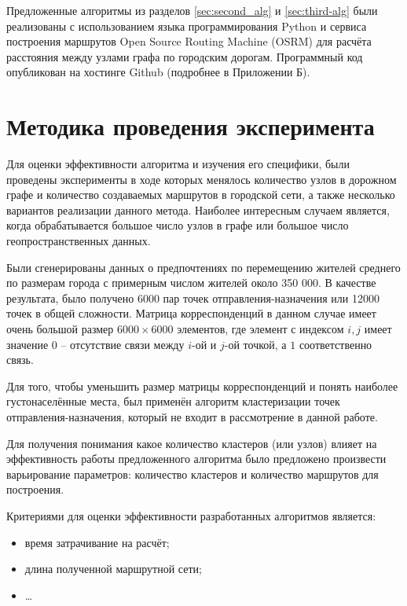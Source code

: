 Предложенные алгоритмы из разделов \ref{sec:second_alg} и \ref{sec:third-alg} были реализованы с использованием языка 
программирования Python и сервиса построения маршрутов Open Source Routing Machine (OSRM) для расчёта расстояния между 
узлами графа по городским дорогам. Программный код опубликован на хостинге Github (подробнее в Приложении Б).

\section{Методика проведения эксперимента}
Для оценки эффективности алгоритма и изучения его специфики, были проведены эксперименты в ходе которых 
менялось количество узлов в дорожном графе и количество создаваемых маршрутов в городской сети, а также 
несколько вариантов реализации данного метода. Наиболее интересным случаем является, когда обрабатывается 
большое число узлов в графе или большое число геопространственных данных.

Были сгенерированы данных о предпочтениях по перемещению жителей среднего по размерам города с примерным 
числом жителей около 350 000. В качестве результата, было получено 6000 пар точек отправления-назначения или 
12000 точек в общей сложности. Матрица корреспонденций в данном случае имеет очень большой размер 
\( 6000 \times 6000 \) элементов, где элемент с индексом \( i, j \) имеет значение \( 0 \) -- отсутствие связи 
между \( i \)-ой и \( j \)-ой точкой, а \( 1 \) соответственно связь.

Для того, чтобы уменьшить размер матрицы корреспонденций и понять наиболее густонаселённые места, был 
применён алгоритм кластеризации точек отправления-назначения, который не входит в рассмотрение в данной 
работе.

Для получения понимания какое количество кластеров (или узлов) влияет на эффективность работы предложенного 
алгоритма было предложено произвести варьирование параметров: количество кластеров и количество маршрутов для 
построения.

Критериями для оценки эффективности разработанных алгоритмов является:
\begin{itemize}
    \item время затрачивание на расчёт;
    \item длина полученной маршрутной сети;
    \item \ldots
\end{itemize}

